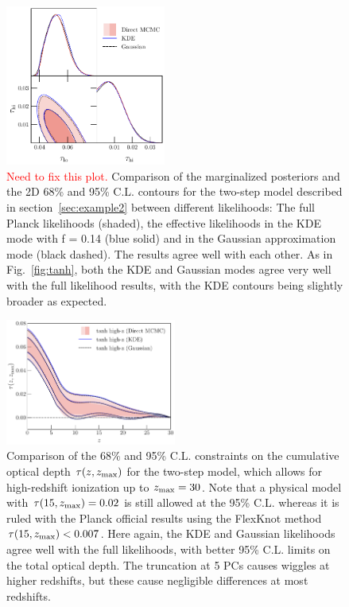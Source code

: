 \documentclass[prd,twocolumn,amsmath,amssymb,floatfix,superscriptaddress,nofootinbib]{revtex4-1}
\newcommand{\refsec}[1]{section~\ref{sec:#1}}
\newcommand{\zmax}{z_{\rm max}}
\newcommand{\ch}[1]{\textcolor{red}{#1}}
\begin{document}
%
%

\begin{figure}[t]
\includegraphics[width=0.47\textwidth]{paper/plots/pl18_tanh_highz_test5_run1_vs_relike_tanh_highz_test8_run9_f0p14_taulo_prior_0p03_zre_prior_6p1_taulo_prior_0p0_tri.pdf}
\caption{\ch{Need to fix this plot.}   Comparison of the marginalized posteriors and the 2D 68\% and 95\% C.L. contours for the two-step model  described in \refsec{example2} between different likelihoods: The full Planck likelihoods (shaded), the effective likelihoods in the KDE mode with f = 0.14 (blue solid) and in the Gaussian approximation mode (black dashed). The results agree well with each other. As in Fig.~\ref{fig:tanh}, both the KDE and Gaussian modes agree very well with the full likelihood results, with the KDE  contours being slightly broader as expected.
}
\label{fig:two_parameter_model_2D}
\end{figure}

\begin{figure}
\includegraphics[width=0.5\textwidth]{plots/pl18_taugtz_tanh_highz_direct_vs_kde_vs_gaussian_dz_auto_zre_prior_6p1.pdf}
\caption{Comparison of the 68\% and 95\% C.L. constraints on the cumulative optical depth $\tau(z, \zmax)$ for the two-step model, which allows for high-redshift ionization up to $\zmax =30$. Note that a physical model with $\tau(15, \zmax) = 0.02$ is still allowed at the 95\% C.L. whereas it is ruled with the Planck official results using the FlexKnot method $\tau(15, \zmax) < 0.007$. Here again, the KDE and Gaussian likelihoods agree well with the full likelihoods, with better 95\% C.L. limits on the total optical depth. The truncation at 5 PCs causes wiggles at higher redshifts, but these cause negligible differences at most redshifts.
}
\label{fig:plot_taugtz_two_step_contours}
\end{figure}
 
\end{document}
